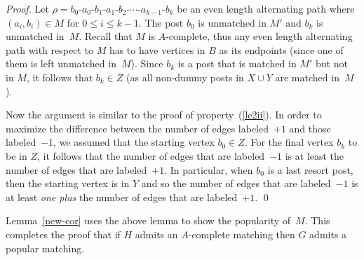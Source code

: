 \documentclass[11pt]{llncs}
\begin{document}
\begin{proof}
\medskip

 Let $\rho = b_0$-$a_0$-$b_1$-$a_1$-$b_2$-$\cdots$-$a_{k-1}$-$b_k$ be an 
even length alternating path where $(a_i,b_i) \in M$ for $0 \le i \le k-1$. The post $b_0$ is unmatched in $M'$ 
and $b_k$ is unmatched in~$M$. Recall that $M$ is $A$-complete, thus any even length alternating path with 
respect to $M$ has to have vertices in $B$ as its endpoints (since one of them is left unmatched in~$M$). 
Since $b_k$ is a post that is matched in $M'$ but not in $M$, it follows that $b_k \in Z$ (as all non-dummy 
posts in $X \cup Y$ are matched in~$M$).

Now the argument is similar to the proof of property~(\ref{le2ii}). In order to maximize the difference between 
the number of edges labeled~$+1$ and those labeled~$-1$, we assumed that the starting vertex $b_0 \in Z$. For the 
final vertex $b_k$ to be in $Z$, it follows that the number of edges that are labeled~$-1$ is at least the number 
of edges that are labeled~$+1$. In particular, when $b_0$ is a last resort post, then the starting vertex is in $Y$ 
and so the number of edges that are labeled~$-1$ is at least {\em one plus} the number of edges that are labeled~$+1$. \qed
\end{proof}

Lemma~\ref{new-cor} uses the above lemma to show the popularity of~$M$. This completes the proof that if $H$ admits an 
$A$-complete matching then $G$ admits a popular matching.
\end{document}
